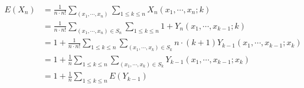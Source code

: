 \documentclass[11pt,fleqn]{article}
\begin{document}
\begin{align*}
E(X_n) 
	&= \frac{1}{n \cdot n!} \sum\limits_{(x_1, \cdots, x_n)} 
		\sum_{1 \le k \le n} X_n (x_1, \cdots, x_n ; k) \\
	&= \frac{1}{n \cdot n!} \sum\limits_{(x_1, \cdots, x_n) \in S_n}
		\sum\limits_{1 \le k \le n} 1 + Y_n (x_1, \cdots, x_{k-1} ; k) \\
	&= 1 + \frac{1}{n \cdot n!} \sum\limits_{1 \le k \le n}
		\sum\limits_{(x_1, \cdots, x_{k}) \in S_k} 
			n \cdot (k+1) Y_{k-1} (x_1, \cdots, x_{k-1}; x_k) \\
	&= 1 + \frac{1}{n} \sum\limits_{1 \le k \le n}
		\sum\limits_{(x_1, \cdots, x_{k}) \in S_k} 
			Y_{k-1} (x_1, \cdots, x_{k-1}; x_k) \\
	&= 1 + \frac{1}{n} \sum\limits_{1 \le k \le n} E(Y_{k-1})
\end{align*}
\end{document}
